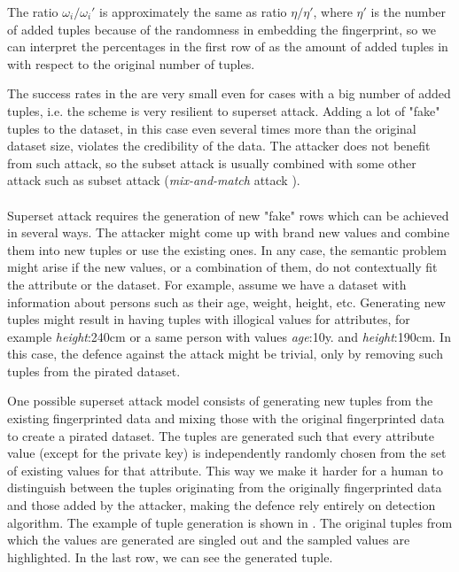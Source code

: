The ratio $\omega_i/\omega_i'$ is approximately the same as ratio $\eta/\eta'$, where $\eta'$ is the number of added tuples because of the randomness in embedding the fingerprint, so we can interpret the percentages in the first row of  as the amount of added tuples in with respect to the original number of tuples. 

The success rates in the  are very small even for cases with a big number of added tuples, i.e. the scheme is very resilient to superset attack. 
Adding a lot of "fake" tuples to the dataset, in this case even several times more than the original dataset size, violates the credibility of the data. 
The attacker does not benefit from such attack, so the subset attack is usually combined with some other attack such as subset attack (\textit{mix-and-match} attack \cite{li2005fingerprinting}). 

\paragraph{}
Superset attack requires the generation of new "fake" rows which can be achieved in several ways. 
The attacker might come up with brand new values and combine them into new tuples or use the existing ones. 
In any case, the semantic problem might arise if the new values, or a combination of them, do not contextually fit the attribute or the dataset. 
For example, assume we have a dataset with information about persons such as their age, weight, height, etc. 
Generating new tuples might result in having tuples with illogical values for attributes, for example \textit{height}:240cm or a same person with values \textit{age}:10y. and \textit{height}:190cm.
In this case, the defence against the attack might be trivial, only by removing such tuples from the pirated dataset. 

One possible superset attack model consists of generating new tuples from the existing fingerprinted data and mixing those with the original fingerprinted data to create a pirated dataset.
The tuples are generated such that every attribute value (except for the private key) is independently randomly chosen from the set of existing values for that attribute.
This way we make it harder for a human to distinguish between the tuples originating from the originally fingerprinted data and those added by the attacker, making the defence rely entirely on detection algorithm.
The example of tuple generation is shown in .
The original tuples from which the values are generated are singled out and the sampled values are highlighted.
In the last row, we can see the generated tuple.


